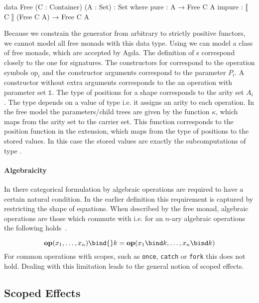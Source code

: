 \begin{code}
data Free (C : Container) (A : Set) : Set where
  pure    : A → Free C A
  impure  : ⟦ C ⟧ (Free C A) → Free C A
\end{code}
Because we constrain the generator from arbitrary to strictly positive functors,
we cannot model all free monads with this data type.
Using  we can model a class of free monads, which are
accepted by Agda.
The definition of s correspond closely to the one for
signatures.
The constructors for  correspond to the operation symbols
$\mathrm{op}_i$ and the constructor arguments correspond to the parameter $P_i$.
A constructor without extra arguments corresponds to the an operation with
parameter set $\mathbb{1}$.
The type of positions for a shape corresponds to the arity set $A_i$.
The  type depends on a value of type  i.e. it
assigns an arity to each operation.
In the free model the parameters/child trees are given by the function $\kappa$,
which maps from the arity set to the carrier set.
This function corresponds to the position function in the
 extension, which maps from the type of positions to the
stored values.
In this case the stored values are exactly the subcomputations of type
\AgdaSpace{}\AgdaSpace{}.

\paragraph{Algebraicity}
In there categorical formulation by \textcite{DBLP:conf/fossacs/PlotkinP02}
algebraic operations are required to have a certain natural condition.
In the earlier definition this requirement is captured by restricting the shape
of equations.
When described by the free monad, algebraic operations are those which commute
with \AgdaFunction{>>=} i.e. for an $n$-ary algebraic operations the following
holds~\cite{DBLP:conf/lics/PirogSWJ18}.

\[
  \mathbf{op}(x_1,\dots ,x_n) \bind{} k = \mathbf{op}(x_1\bind k,\dots
  ,x_n\bind k)
\]
For common operations with scopes, such as \texttt{once}, \texttt{catch} or
\texttt{fork} this does not hold.
Dealing with this limitation leads to the general notion of scoped effects.


\subsection{Scoped Effects}
\label{preliminaries:scoped-effects}

